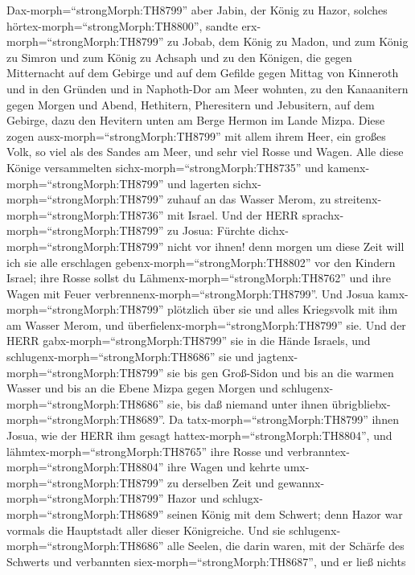  Dax-morph=``strongMorph:TH8799'' aber Jabin, der König zu
Hazor, solches hörtex-morph=``strongMorph:TH8800'', sandte
erx-morph=``strongMorph:TH8799'' zu Jobab, dem König zu Madon, und zum
König zu Simron und zum König zu Achsaph  und zu den
Königen, die gegen Mitternacht auf dem Gebirge und auf dem Gefilde gegen
Mittag von Kinneroth und in den Gründen und in Naphoth-Dor am Meer
wohnten,  zu den Kanaanitern gegen Morgen und Abend,
Hethitern, Pheresitern und Jebusitern, auf dem Gebirge, dazu den
Hevitern unten am Berge Hermon im Lande Mizpa.  Diese zogen
ausx-morph=``strongMorph:TH8799'' mit allem ihrem Heer, ein großes Volk,
so viel als des Sandes am Meer, und sehr viel Rosse und Wagen.
 Alle diese Könige versammelten
sichx-morph=``strongMorph:TH8735'' und
kamenx-morph=``strongMorph:TH8799'' und lagerten
sichx-morph=``strongMorph:TH8799'' zuhauf an das Wasser Merom, zu
streitenx-morph=``strongMorph:TH8736'' mit Israel.  Und der
HERR sprachx-morph=``strongMorph:TH8799'' zu Josua: Fürchte
dichx-morph=``strongMorph:TH8799'' nicht vor ihnen! denn morgen um diese
Zeit will ich sie alle erschlagen gebenx-morph=``strongMorph:TH8802''
vor den Kindern Israel; ihre Rosse sollst du
Lähmenx-morph=``strongMorph:TH8762'' und ihre Wagen mit Feuer
verbrennenx-morph=``strongMorph:TH8799''.  Und Josua
kamx-morph=``strongMorph:TH8799'' plötzlich über sie und alles
Kriegsvolk mit ihm am Wasser Merom, und
überfielenx-morph=``strongMorph:TH8799'' sie.  Und der HERR
gabx-morph=``strongMorph:TH8799'' sie in die Hände Israels, und
schlugenx-morph=``strongMorph:TH8686'' sie und
jagtenx-morph=``strongMorph:TH8799'' sie bis gen Groß-Sidon und bis an
die warmen Wasser und bis an die Ebene Mizpa gegen Morgen und
schlugenx-morph=``strongMorph:TH8686'' sie, bis daß niemand unter ihnen
übrigbliebx-morph=``strongMorph:TH8689''.  Da
tatx-morph=``strongMorph:TH8799'' ihnen Josua, wie der HERR ihm gesagt
hattex-morph=``strongMorph:TH8804'', und
lähmtex-morph=``strongMorph:TH8765'' ihre Rosse und
verbranntex-morph=``strongMorph:TH8804'' ihre Wagen  und
kehrte umx-morph=``strongMorph:TH8799'' zu derselben Zeit und
gewannx-morph=``strongMorph:TH8799'' Hazor und
schlugx-morph=``strongMorph:TH8689'' seinen König mit dem Schwert; denn
Hazor war vormals die Hauptstadt aller dieser Königreiche. 
Und sie schlugenx-morph=``strongMorph:TH8686'' alle Seelen, die darin
waren, mit der Schärfe des Schwerts und verbannten
siex-morph=``strongMorph:TH8687'', und er ließ nichts
